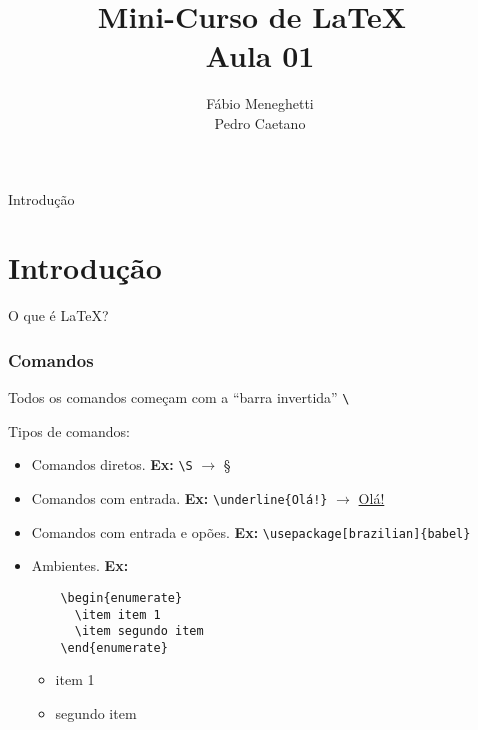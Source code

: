 \documentclass[12pt]{beamer}
\title{Mini-Curso de \LaTeX\ \\ Aula 01}
\author{Fábio Meneghetti\\
Pedro Caetano}
\date{}
\begin{document}
  \begin{frame}
    \titlepage
  \end{frame}

  \begin{frame}{Introdução}
    \section{Introdução}
    O que é \LaTeX?
  \end{frame}

\begin{frame}[fragile]
    \frametitle{Comandos}
     Todos os comandos começam com a ``barra invertida'' \verb+\+
\medskip

     Tipos de comandos:
     \begin{itemize}
       \item Comandos diretos. \textbf{Ex:} \verb+\S+ $\rightarrow$ \S

       \item Comandos com entrada. \textbf{Ex:} \verb+\underline{Olá!}+ $\rightarrow$ \underline{Olá!}

     \end{itemize}
\end{frame}

\begin{frame}[fragile]
  \begin{itemize}
    \item Comandos com entrada e opões. \textbf{Ex:} \verb+\usepackage[brazilian]{babel}+

    \item Ambientes. \textbf{Ex:}
    \begin{verbatim}
    \begin{enumerate}
      \item item 1
      \item segundo item
    \end{enumerate}
  \end{verbatim}
  \begin{itemize}
    \item item 1
    \item segundo item
  \end{itemize}
  \end{itemize}
\end{frame}
\end{document}
